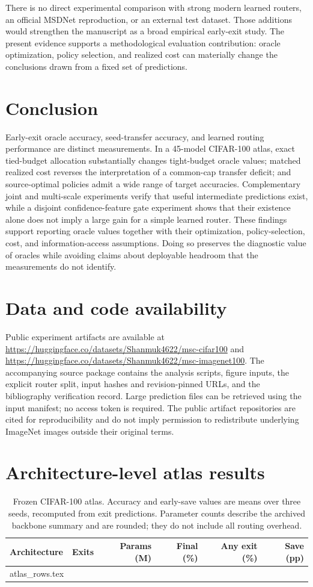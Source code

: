 \documentclass[11pt,a4paper]{article}
\makeatletter
\newcommand{\tablerows}[1]{\@@input #1 }
\makeatother
\begin{document}
There is no direct experimental comparison with strong modern learned routers, an official MSDNet reproduction, or an external test dataset. Those additions would strengthen the manuscript as a broad empirical early-exit study. The present evidence supports a methodological evaluation contribution: oracle optimization, policy selection, and realized cost can materially change the conclusions drawn from a fixed set of predictions.

\section{Conclusion}
Early-exit oracle accuracy, seed-transfer accuracy, and learned routing performance are distinct measurements. In a 45-model CIFAR-100 atlas, exact tied-budget allocation substantially changes tight-budget oracle values; matched realized cost reverses the interpretation of a common-cap transfer deficit; and source-optimal policies admit a wide range of target accuracies. Complementary joint and multi-scale experiments verify that useful intermediate predictions exist, while a disjoint confidence-feature gate experiment shows that their existence alone does not imply a large gain for a simple learned router. These findings support reporting oracle values together with their optimization, policy-selection, cost, and information-access assumptions. Doing so preserves the diagnostic value of oracles while avoiding claims about deployable headroom that the measurements do not identify.

\section*{Data and code availability}
Public experiment artifacts are available at \url{https://huggingface.co/datasets/Shanmuk4622/msc-cifar100} and \url{https://huggingface.co/datasets/Shanmuk4622/msc-imagenet100}. The accompanying source package contains the analysis scripts, figure inputs, the explicit router split, input hashes and revision-pinned URLs, and the bibliography verification record. Large prediction files can be retrieved using the input manifest; no access token is required. The public artifact repositories are cited for reproducibility and do not imply permission to redistribute underlying ImageNet images outside their original terms.

\appendix
\section{Architecture-level atlas results}\label{app:atlas}
\begin{table}[h]
\centering\small
\caption{Frozen CIFAR-100 atlas. Accuracy and early-save values are means over three seeds, recomputed from exit predictions. Parameter counts describe the archived backbone summary and are rounded; they do not include all routing overhead.}
\begin{tabular}{@{}lrrrrr@{}}
\toprule
Architecture & Exits & Params (M) & Final (\%) & Any exit (\%) & Save (pp) \\
\midrule
\tablerows{atlas_rows.tex}
\bottomrule
\end{tabular}
\end{table}
\end{document}
